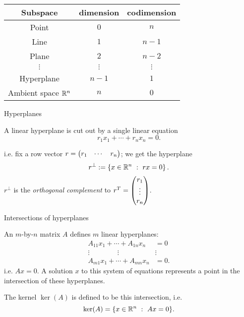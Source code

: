 \documentclass{beamer}
\begin{document}
\begin{frame}
\begin{center}
\begin{tabular}{ccc}
Subspace & dimension & codimension \\
\hline{}Point & \(0\) & \(n\)\\
Line & \(1\) &  \(n-1\)\\
Plane & \(2\) &  \(n-2\)\\
\(\vdots\) & \(\vdots\) & \(\vdots\)\\
Hyperplane & \(n-1\) & \(1\)\\
Ambient space \(\mathbb{R}^n\) & \(n\) & \(0\)
\end{tabular}
\end{center}




\end{frame}
\begin{frame}
{Hyperplanes}


A linear hyperplane is cut out by a single linear equation
\[r_1x_1+\cdots+r_nx_n=0.\]


i.e. fix a row vector \(r=\begin{pmatrix} r_1 & \cdots & r_n\end{pmatrix}\);
we get the hyperplane \[r^{\perp}:=\left\{x\in\mathbb{R}^n\ :\
rx=0\right\}.\] \onslide<3->\(r^{\perp}\) is the {\em orthogonal
complement} to \(r^T=\begin{pmatrix} r_1 \\ \vdots \\ r_n\end{pmatrix}\).


\end{frame}
\begin{frame}
{Intersections of hyperplanes}


An \(m\)-by-\(n\) matrix \(A\) defines \(m\) linear hyperplanes:
\begin{align*}
A_{11}x_1+\cdots+A_{1n}x_n&=0\\
\vdots\qquad\qquad\vdots\qquad\qquad&\vdots\\
A_{m1}x_1+\cdots+A_{mn}x_n&=0.
\end{align*}
i.e. \(Ax=0\). A solution \(x\) to this system of equations
represents a point in the intersection of these hyperplanes.


\begin{Definition}
The kernel \(\ker(A)\) is defined to be this intersection, i.e.
\[\ker(A)=\{x\in\mathbb{R}^n\ :\ Ax=0\}.\]


\end{Definition}
\end{frame}
\end{document}
